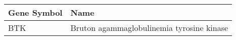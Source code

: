\begin{tabular}{ll}
\toprule
Gene Symbol &                                      Name \\
\midrule
        BTK & Bruton agammaglobulinemia tyrosine kinase \\
\bottomrule
\end{tabular}
